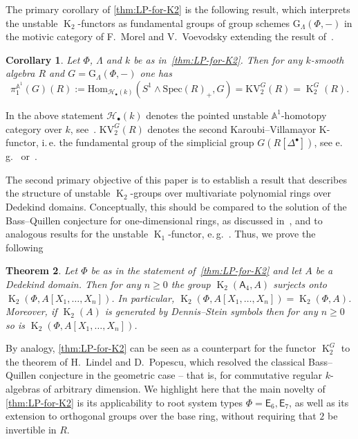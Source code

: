 \documentclass[oneside, 10pt]{amsart}
\DeclareMathOperator{\K}{K}
\newcommand{\rA}{\mathsf{A}}
\newcommand{\rE}{\mathsf{E}}
\newtheorem{thm}{Theorem}
\numberwithin{equation}{section}
\numberwithin{thm}{section}
\numberwithin{lemma}{section}
\newtheorem{cor}[thm]{Corollary}
\theoremstyle{definition}
\theoremstyle{remark}
\begin{document}
The primary corollary of \cref{thm:LP-for-K2} is the following result, which interprets the unstable $\K_2$-functors as fundamental groups of group schemes
$\mathrm{G}_\Lambda(\Phi, -)$ in the motivic category of F.~Morel and V.~Voevodsky extending the result of~\cite[Corollary~1.2]{LSV2}.

\begin{cor} \label{cor:motivic-pi1} Let $\Phi$, $\Lambda$ and $k$ be as in~\cref{thm:LP-for-K2}.
Then for any $k$-smooth algebra $R$ and $G = \mathrm{G}_{\Lambda}(\Phi, -)$ one has
\[ \pi_1^{\mathbb{A}^1}(G)(R) := \mathrm{Hom}_{\mathscr{H}_{\bullet}(k)}(S^1 \wedge \mathrm{Spec}(R)_+, G) = \mathrm{KV}_2^{G}(R) = \K_2^G(R).\]
\end{cor}
In the above statement $\mathscr{H}_\bullet(k)$ denotes the pointed unstable $\mathbb{A}^1$-homotopy category over $k$, see~\cite{MV99}.
$\mathrm{KV}_2^{G}(R)$ denotes the second Karoubi--Villamayor K-functor, i.\,e. the fundamental group of
the simplicial group $G(R[\Delta^\bullet])$, see e.\,g.~\cite[\S~3]{Jar83} or~\cite[\S~3.2]{LSV2}.

The second primary objective of this paper is to establish a result that describes the structure of unstable $\K_2$-groups
over multivariate polynomial rings over Dedekind domains.
Conceptually, this should be compared to the solution of the Bass--Quillen conjecture for one-dimensional rings, as discussed in~\cite[\S~V.3]{Lam10},
and to analogous results for the unstable $\K_1$-functor, e.\,g.~\cite[Theorem~1.1]{St-Ded}.
Thus, we prove the following

\begin{thm} \label{cor:dedekind}
Let $\Phi$ be as in the statement of~\cref{thm:LP-for-K2} and let $A$ be a Dedekind domain.
Then for any $n \geq 0$ the group $\K_2(\rA_4, A)$ surjects onto $\K_2(\Phi, A[X_1,\ldots, X_n])$.
In particular, $\K_2(\Phi, A[X_1,\ldots, X_n]) = \K_2(\Phi, A)$.
Moreover, if $\K_2(A)$ is generated by Dennis--Stein symbols then for any $n \geq 0$ so is $\K_2(\Phi, A[X_1,\ldots, X_n])$.
\end{thm}

By analogy, \cref{thm:LP-for-K2} can be seen as a counterpart for the functor $\K_2^G$ to the theorem of H.~Lindel and D.~Popescu,
 which resolved the classical Bass--Quillen conjecture in the geometric case -- that is, for commutative regular $k$-algebras of arbitrary dimension.
We highlight here that the main novelty of \cref{thm:LP-for-K2} is its applicability to root system types $\Phi = \rE_6, \rE_7$,
as well as its extension to orthogonal groups over the base ring, without requiring that $2$ be invertible in $R$.
\end{document}
